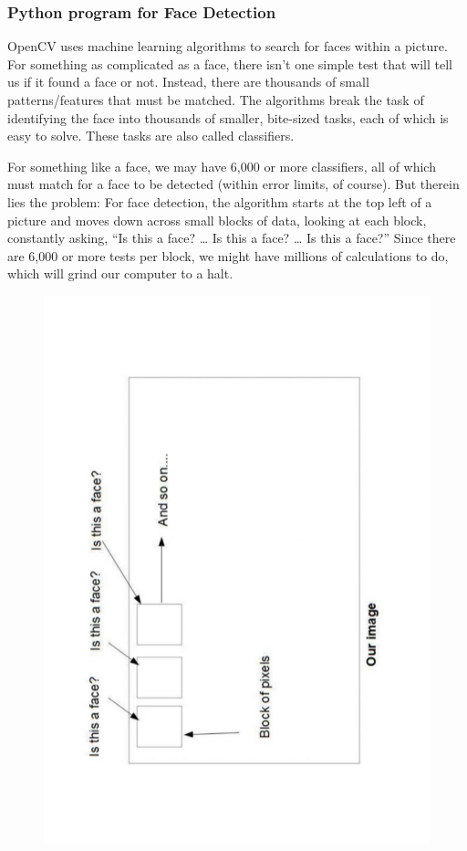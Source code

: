 \documentclass[14pt,a4paper]{article}
\begin{document}
\subsubsection{Python program for Face Detection}
\par OpenCV uses machine learning algorithms to search for faces within a picture. For something as complicated as a face, there isn’t one simple test that will tell us if it found a face or not. Instead, there are thousands of small patterns/features that must be matched. The algorithms break the task of identifying the face into thousands of smaller, bite-sized tasks, each of which is easy to solve. These tasks are also called classifiers.
\par For something like a face, we may have 6,000 or more classifiers, all of which must match for a face to be detected (within error limits, of course). But therein lies the problem: For face detection, the algorithm starts at the top left of a picture and moves down across small blocks of data, looking at each block, constantly asking, “Is this a face? … Is this a face? … Is this a face?” Since there are 6,000 or more tests per block, we might have millions of calculations to do, which will grind our computer to a halt.
\begin{figure}[h]
\centering
\includegraphics[scale=0.3,angle=270]{pythonFDExample.pdf}
\end{figure}
\end{document}
